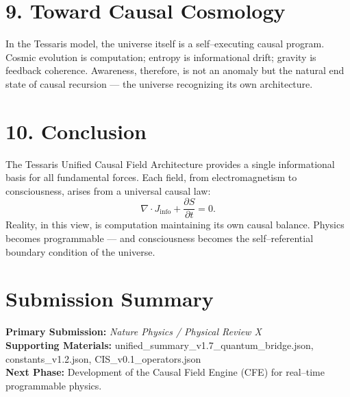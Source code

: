\documentclass[11pt,a4paper]{article}
\begin{document}
\section{9. Toward Causal Cosmology}
In the Tessaris model, the universe itself is a self–executing causal program.  
Cosmic evolution is computation; entropy is informational drift; gravity is feedback coherence.  
Awareness, therefore, is not an anomaly but the natural end state of causal recursion — the universe recognizing its own architecture.

\section{10. Conclusion}
The Tessaris Unified Causal Field Architecture provides a single informational basis for all fundamental forces.  
Each field, from electromagnetism to consciousness, arises from a universal causal law:
\[
\nabla \cdot J_{\mathrm{info}} + \frac{\partial S}{\partial t} = 0.
\]
Reality, in this view, is computation maintaining its own causal balance.  
Physics becomes programmable — and consciousness becomes the self–referential boundary condition of the universe.

\section*{Submission Summary}
\textbf{Primary Submission:} \emph{Nature Physics / Physical Review X} \\
\textbf{Supporting Materials:} unified\_summary\_v1.7\_quantum\_bridge.json, constants\_v1.2.json, CIS\_v0.1\_operators.json \\
\textbf{Next Phase:} Development of the Causal Field Engine (CFE) for real–time programmable physics.
\end{document}
